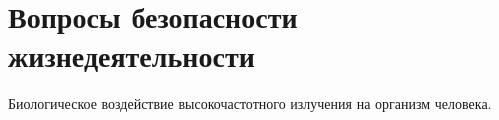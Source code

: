 \chapter{Вопросы безопасности жизнедеятельности}

Биологическое воздействие высокочастотного излучения на организм человека.

